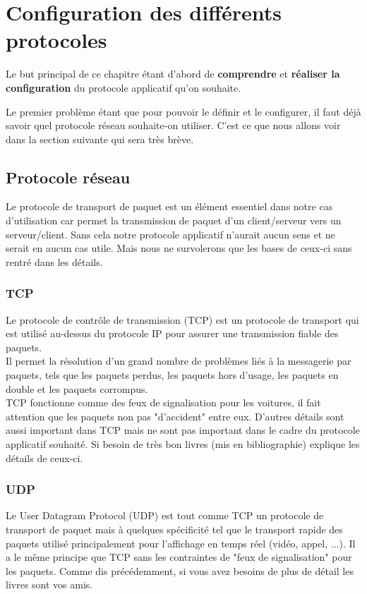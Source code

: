 \chapter{Configuration des différents protocoles}

Le but principal de ce chapitre étant d'abord de \textbf{comprendre} et 
\textbf{réaliser la configuration} du protocole applicatif qu'on souhaite. 

Le premier problème étant que pour pouvoir le définir et le configurer, il faut déjà savoir quel protocole réseau souhaite-on utiliser. 
C'est ce que nous allons voir dans la section suivante qui sera très brève.

\section{Protocole réseau}

Le protocole de transport de paquet est un élément essentiel dans notre cas d'utilisation car permet la transmission de paquet d'un client/serveur vers un serveur/client. Sans cela notre protocole applicatif n'aurait aucun sens et ne serait en aucun cas utile. Mais nous ne survolerons que les bases de ceux-ci sans rentré dans les détails.

\subsection{TCP}

Le protocole de contrôle de transmission (TCP) est un protocole de transport qui est utilisé au-dessus du protocole IP pour assurer une transmission fiable des paquets.
\\
Il permet la résolution d'un grand nombre de problèmes liés à la messagerie par paquets, tels que les paquets perdus, les paquets hors d'usage, les paquets en double et les paquets corrompus.
\\
TCP fonctionne comme des feux de signalisation pour les voitures, il fait attention que les paquets non pas "d'accident" entre eux.
D'autres détails sont aussi important dans TCP mais ne sont pas important dans le cadre du protocole applicatif souhaité.
Si besoin de très bon livres (mis en bibliographie) explique les détails de ceux-ci.

\subsection{UDP}

Le User Datagram Protocol (UDP) est tout comme TCP un protocole de transport de paquet mais à quelques spécificité tel que le transport rapide des paquets utilisé principalement pour l'affichage en temps réel (vidéo, appel, ...). Il a le même principe que TCP sans les contraintes de "feux de signalisation" pour les paquets.
Comme dis précédemment, si vous avez besoins de plus de détail les livres sont vos amis.

